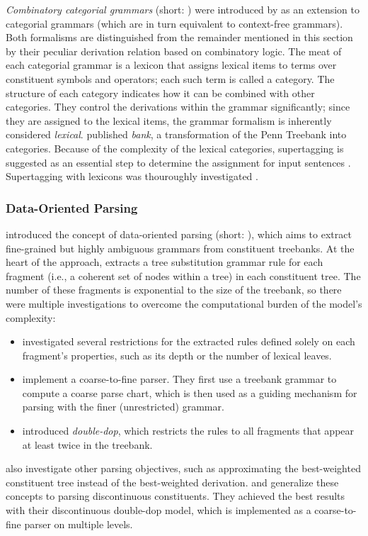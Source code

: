 \documentclass[../document.tex]{subfiles}
\begin{document}
    \emph{Combinatory categorial grammars} (short: ) were introduced by \citet{Ste11} as an extension to categorial grammars (which are in turn equivalent to context-free grammars).
    Both formalisms are distinguished from the remainder mentioned in this section by their peculiar derivation relation based on combinatory logic.
    The meat of each categorial grammar is a lexicon that assigns lexical items to terms over constituent symbols and operators; each such term is called a category.
    The structure of each category indicates how it can be combined with other categories.
    They control the derivations within the grammar significantly; since they are assigned to the lexical items, the grammar formalism is inherently considered \emph{lexical}.
     published \emph{ bank}, a transformation of the Penn Treebank into  categories.
    Because of the complexity of the lexical categories, supertagging is suggested as an essential step to determine the assignment for input sentences \citep{Clark04}.
    Supertagging with  lexicons was thouroughly investigated \citep{clark2002supertagging, LewisSteedman14, vaswani2016supertagging, Kad18, StaSte20}.

    \subsubsection*{Data-Oriented Parsing}
     introduced the concept of data-oriented parsing (short: ), which aims to extract fine-grained but highly ambiguous grammars from constituent treebanks.
    At the heart of the approach, \citeauthor{Bod92} extracts a tree substitution grammar rule for each fragment (i.e.\@, a coherent set of nodes within a tree) in each constituent tree.
    The number of these fragments is exponential to the size of the treebank, so there were multiple investigations to overcome the computational burden of the model's complexity:
    \begin{itemize}
        \item \citet{Bod01} investigated several restrictions for the extracted rules defined solely on each fragment's properties, such as its depth or the number of lexical leaves.
        \item \citet{Ban10} implement a coarse-to-fine parser. They first use a treebank grammar to compute a coarse parse chart, which is then used as a guiding mechanism for parsing with the finer (unrestricted)  grammar.
        \item \citet{San11} introduced \emph{double-dop}, which restricts the rules to all fragments that appear at least twice in the treebank.
    \end{itemize}
     also investigate other parsing objectives, such as approximating the best-weighted constituent tree instead of the best-weighted derivation.
     and \cite{CraSchBod16} generalize these concepts to parsing discontinuous constituents.
    They achieved the best results with their discontinuous double-dop model, which is implemented as a coarse-to-fine parser on multiple levels.
\end{document}
